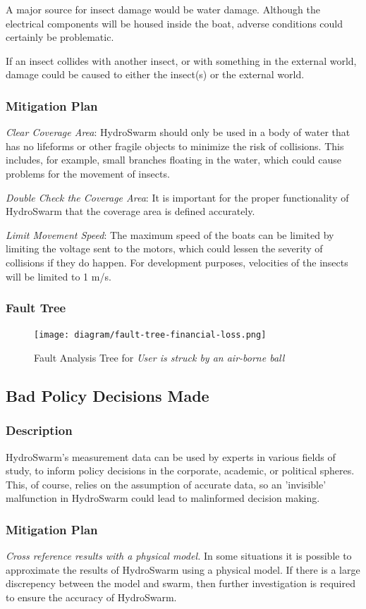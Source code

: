 \documentclass[11pt]{article}
\begin{document}
A major source for insect damage would be water damage. Although the electrical components will be
housed inside the boat, adverse conditions could certainly be problematic.

If an insect collides with another insect, or with something in the external world, damage could be
caused to either the insect(s) or the external world.
\subsubsection*{Mitigation Plan}
\textit{Clear Coverage Area}: HydroSwarm should only be used in a body of water that has no
lifeforms or other fragile objects to minimize the risk of collisions. This includes, for example,
small branches floating in the water, which could cause problems for the movement of insects.

\textit{Double Check the Coverage Area}: It is important for the proper functionality of HydroSwarm
that the coverage area is defined accurately. 

\textit{Limit Movement Speed}: The maximum speed of the boats can be limited by limiting the voltage
sent to the motors, which could lessen the severity of collisions if they do happen. For development
purposes, velocities of the insects will be limited to 1 m/s.
\subsubsection*{Fault Tree}
\begin{figure}[H]
   \centering
   \texttt{[image: diagram/fault-tree-financial-loss.png]} %
   \caption{Fault Analysis Tree for \textit{User is struck by an air-borne ball}}
   \label{fig:ft-Air}
\end{figure}

\subsection{Bad Policy Decisions Made}
\subsubsection*{Description}
HydroSwarm's measurement data can be used by experts in various fields of study, to inform
policy decisions in the corporate, academic, or political spheres. This, of course, relies on
the assumption of accurate data, so an 'invisible' malfunction in HydroSwarm could lead to
malinformed decision making.
\subsubsection*{Mitigation Plan}
\textit{Cross reference results with a physical model.} In some situations it is possible to
approximate the results of HydroSwarm using a physical model. If there is a large discrepency
between the model and swarm, then further investigation is required to ensure the accuracy of
HydroSwarm.
\end{document}
